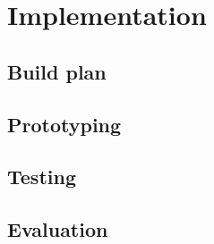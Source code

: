 \section{Implementation}

\subsection{Build plan}

\blindtext

\subsection{Prototyping}

\blindtext

\subsection{Testing}

\blindtext

\subsection{Evaluation}

\blindtext
